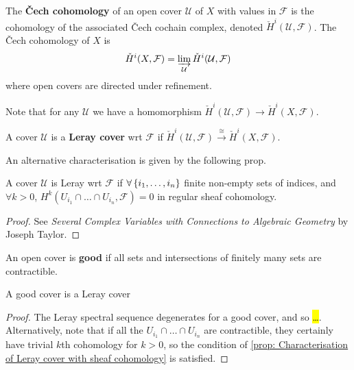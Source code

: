 \documentclass{article}
\begin{document}
\begin{definition}
	The \textbf{\v{C}ech cohomology} of an open cover $\mathcal{U}$ of $X$ with values in $\mathcal{F}$ is the cohomology of the associated \v{C}ech cochain complex, denoted $\check{H}^i(\mathcal{U},\mathcal{F})$. The \v{C}ech cohomology of $X$ is 
	\[
	\check{H}^i(X,\mathcal{F}) = \varinjlim_{\mathcal{U}} \check{H}^i(\mathcal{U},\mathcal{F})
	\]
	where open covers are directed under refinement. 
\end{definition}

Note that for any $\mathcal{U}$ we have a homomorphism $\check{H}^i(\mathcal{U},\mathcal{F}) \to \check{H}^i(X,\mathcal{F})$. 
\begin{definition}
	A cover $\mathcal{U}$ is a \textbf{Leray cover} wrt $\mathcal{F}$ if $\check{H}^i(\mathcal{U},\mathcal{F}) \overset{\cong}{\to} \check{H}^i(X,\mathcal{F})$.
\end{definition}

An alternative characterisation is given by the following prop. 

\begin{prop}\label{prop: Characterisation of Leray cover with sheaf cohomology}
	A cover $\mathcal{U}$ is Leray wrt $\mathcal{F}$ if $\forall \left\{ i_1, \dots, i_n \right\}$ finite non-empty sets of indices, and $\forall k>0$, $H^k(U_{i_1} \cap \dots \cap U_{i_n}, \mathcal{F})=0$ in regular sheaf cohomology. 
\end{prop}
\begin{proof}
	See \textit{Several Complex Variables with Connections to Algebraic Geometry} by Joseph Taylor. 
\end{proof}

\begin{definition}
	An open cover is \textbf{good} if all sets and intersections of finitely many sets are contractible. 
\end{definition}

\begin{prop}
	A good cover is a Leray cover
\end{prop}
\begin{proof}
	The Leray spectral sequence degenerates for a good cover, and so \hl{\dots}. Alternatively, note that if all the $U_{i_1} \cap \dots \cap U_{i_n}$ are contractible, they certainly have trivial $k$th cohomology for $k>0$, so the condition of \ref{prop: Characterisation of Leray cover with sheaf cohomology} is satisfied. 
\end{proof}
\end{document}
